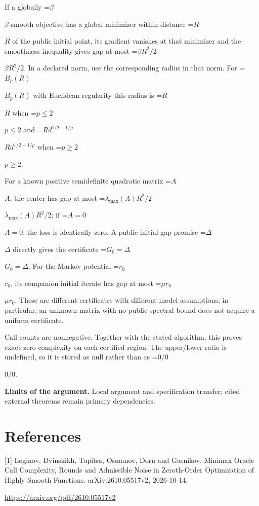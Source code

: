 \documentclass[10pt,a4paper]{article}
\newcommand{\AtlasMath}[1]{\par\begingroup\centering\setbox0=\hbox{$\displaystyle #1$}\ifdim\wd0>1.4\linewidth\typeout{ATLAS WIDE FORMULA: \the\wd0}\fi\ifdim\wd0>\linewidth\resizebox{\linewidth}{!}{\box0}\else\box0\fi\par\endgroup}
\newcommand{\AtlasInlineMath}[1]{\begingroup\setbox0=\hbox{$#1$}\ifdim\wd0>.4\linewidth\endgroup\AtlasMath{#1}\else\endgroup$#1$\fi}
\begin{document}
If a globally \AtlasInlineMath{\beta}-smooth objective has a global minimizer within distance \AtlasInlineMath{R} of the public initial point, its gradient vanishes at that minimizer and the smoothness inequality gives gap at most \AtlasInlineMath{\beta R^2/2}. In a declared norm, use the corresponding radius in that norm. For \AtlasInlineMath{B_p(R)} with Euclidean regularity this radius is \AtlasInlineMath{R} when \AtlasInlineMath{p\le2} and \AtlasInlineMath{R d^{1/2-1/p}} when \AtlasInlineMath{p\ge2}.

For a known positive semidefinite quadratic matrix \AtlasInlineMath{A}, the center has gap at most \AtlasInlineMath{\lambda_{\max}(A)R^2/2}; if \AtlasInlineMath{A=0}, the loss is identically zero. A public initial-gap promise \AtlasInlineMath{\Delta} directly gives the certificate \AtlasInlineMath{G_0=\Delta}. For the Markov potential \AtlasInlineMath{r_0}, its companion initial iterate has gap at most \AtlasInlineMath{\mu r_0}. These are different certificates with different model assumptions; in particular, an unknown matrix with no public spectral bound does not acquire a uniform certificate.

Call counts are nonnegative. Together with the stated algorithm, this proves exact zero complexity on each certified region. The upper/lower ratio is undefined, so it is stored as null rather than as \AtlasInlineMath{0/0}.

\textbf{Limits of the argument.} Local argument and specification transfer; cited external theorems remain primary dependencies.

\section{References}
[1] Loginov, Dvinskikh, Tupitsa, Osmanov, Dorn and Gasnikov. Minimax Oracle Call Complexity, Rounds and Admissible Noise in Zeroth-Order Optimization of Highly Smooth Functions. arXiv:2610.05517v2, 2026-10-14.

\url{https://arxiv.org/pdf/2610.05517v2}
\end{document}
